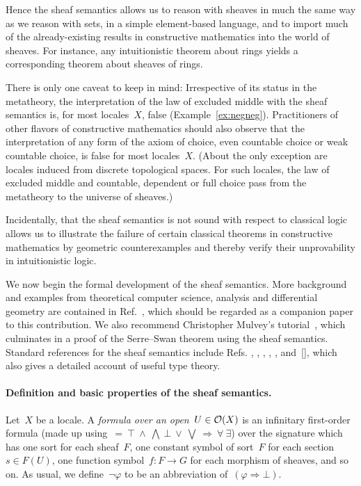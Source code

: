 \documentclass{ws-rv9x6}
\begin{document}
{Hence the sheaf semantics allows us to reason with sheaves in much the same way
as we reason with sets, in a simple element-based language, and to import much
of the already-existing results in constructive mathematics into the world of
sheaves. For instance, any intuitionistic theorem about rings yields a
corresponding theorem about sheaves of rings.

There is only one caveat to keep in mind: Irrespective of its status in the
metatheory, the interpretation of the law of excluded middle with the sheaf
semantics is, for most locales~$X$, false (Example~\ref{ex:negneg}).
Practitioners of other flavors of constructive mathematics should also observe
that the interpretation of any form of the axiom of choice, even countable
choice or weak countable choice, is false for most locales~$X$. (About the only
exception are locales induced from discrete topological spaces. For such
locales, the law of excluded middle and countable, dependent or full choice
pass from the metatheory to the universe of sheaves.)

Incidentally, that the sheaf semantics is not sound with respect to classical
logic allows us to illustrate the failure of certain classical theorems in
constructive mathematics by geometric counterexamples and thereby verify their
unprovability in intuitionistic logic.

We now begin the formal development of the sheaf semantics. More background and
examples from theoretical computer science, analysis and differential geometry
are contained in Ref.~, which should be
regarded as a companion paper to this contribution. We also recommend
Christopher Mulvey's tutorial~\cite{mulvey:repr}, which culminates in a proof
of the Serre--Swan theorem using the sheaf semantics. Standard references for
the sheaf semantics include Refs.
\cite[Chapter~VI]{moerdijk-maclane:sheaves-logic},
\cite[Chapter~14]{goldblatt:topoi},
\cite[Section~5]{caramello:preliminaries},
\cite[Sections~12--15]{streicher:ctcl},
\cite[Chapter~6]{borceux:handbook3},
\cite[Part~D]{johnstone:elephant} and~[],
which also gives a detailed account of useful type theory.

\paragraph{Definition and basic properties of the sheaf semantics.}
Let~$X$ be a locale. A \emph{formula over an open~$U \in \mathcal{O}(X)$} is an
infinitary first-order formula (made up using~${=}\ {\top}\ {\wedge}\ {\bigwedge}\ {\bot}\ {\vee}\
{\bigvee}\ {\Rightarrow}\ {\forall}\ {\exists}$) over the signature which has one sort for
each sheaf~$F$, one constant symbol of sort~$F$ for each section~$s \in F(U)$,
one function symbol~$f : F \to G$ for each morphism of sheaves, and so on. As
usual, we define~$\neg\varphi$ to be an abbreviation of~$(\varphi \Rightarrow
\bot)$.

}
\end{document}
